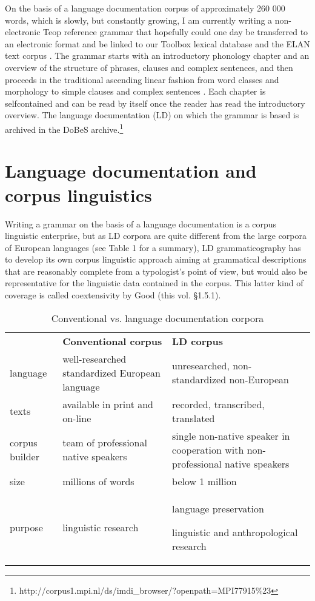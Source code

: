 On the basis of a language documentation corpus of approximately 260 000 words, which is slowly, but constantly growing, I am currently writing a non-electronic Teop reference grammar that hopefully could one day be transferred to an electronic format and be linked to our Toolbox lexical database \citep{SchwartzEtAl2007} and the ELAN text corpus \citep{MoselEtAl2007}. The grammar starts with an introductory phonology chapter and an overview of the structure of phrases, clauses and complex sentences, and then proceeds in the traditional ascending linear fashion from word classes and morphology to simple clauses and complex sentences \citep{Mosel2006a}. Each chapter is selfcontained and can be read by itself once the reader has read the introductory overview. The language documentation (LD) on which the grammar is based is archived in the DoBeS archive.\footnote{http://corpus1.mpi.nl/ds/imdi\_browser/?openpath=MPI77915\%23 }

\section{Language documentation and corpus linguistics} %
 
Writing a grammar on the basis of a language documentation is a corpus linguistic enterprise, but as LD corpora are quite different from the large corpora of European languages (see Table 1 for a summary), LD grammaticography has to develop its own corpus linguistic approach aiming at grammatical descriptions that are reasonably complete from a typologist's point of view, but would also be representative for the linguistic data contained in the corpus. This latter kind of coverage is called coextensivity by Good (this vol. {\S}1.5.1).


\begin{table}
\begin{tabular}{p{1cm}p{5cm}p{5cm}}

 &
\bfseries Conventional corpus  &
\bfseries LD corpus \\
 language  &
 well-researched standardized European language  &
 unresearched, non-standardized non-European \\
 texts  &
 available in print and on-line &
 recorded, transcribed, translated \\
 corpus builder  &
 team of professional native speakers  &
 single non-native speaker in cooperation with non-professional native speakers\\
 size  &
 millions of words  &
 below 1 million \\
 purpose  &
 linguistic research  &
{ language preservation }

 linguistic and anthropological research \\
\end{tabular}
\caption{Conventional vs. language documentation corpora}
\label{tab:m10-1}
\end{table} 



